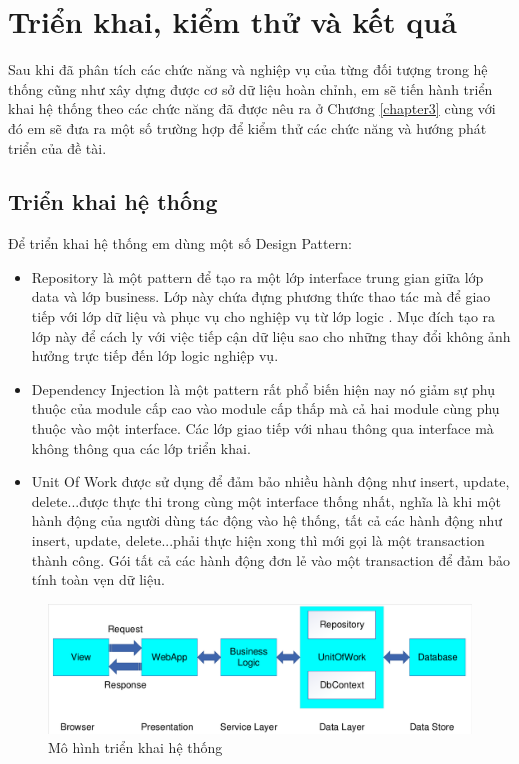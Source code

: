 \chapter{Triển khai, kiểm thử và kết quả}
\label{chapter4}
Sau khi đã phân tích các chức năng và nghiệp vụ của từng đối tượng trong hệ thống cũng như xây dựng được cơ sở dữ liệu hoàn chỉnh, em sẽ tiến hành triển khai hệ thống theo các chức năng đã được nêu ra ở Chương \ref{chapter3} cùng với đó em sẽ đưa ra một số trường hợp để kiểm thử các chức năng và hướng phát triển của đề tài.
\section{Triển khai hệ thống}
Để triển khai hệ thống em dùng một số Design Pattern:
\begin{itemize}
\item Repository là một pattern để tạo ra một lớp interface trung gian giữa lớp data và lớp business. Lớp này chứa đựng phương thức thao tác mà để giao tiếp với lớp dữ liệu và phục vụ cho nghiệp vụ từ lớp logic . Mục đích tạo ra lớp này để cách ly với việc tiếp cận dữ liệu sao cho những thay đổi không ảnh hưởng trực tiếp đến lớp logic nghiệp vụ.
\item Dependency Injection là một pattern rất phổ biến hiện nay nó giảm sự phụ thuộc của module cấp cao vào module cấp thấp mà cả hai module cùng phụ thuộc vào một interface. Các lớp giao tiếp với nhau thông qua interface mà không thông qua các lớp triển khai.
\item Unit Of Work được sử dụng để đảm bảo nhiều hành động như insert, update, delete...được thực thi trong cùng một interface thống nhất, nghĩa là khi một hành động của người dùng tác động vào hệ thống, tất cả các hành động như insert, update, delete...phải thực hiện xong thì mới gọi là một transaction thành công. Gói tất cả các hành động đơn lẻ vào một transaction để đảm bảo tính toàn vẹn dữ liệu.	
\end{itemize}
\begin{center}
    \begin{figure}[h]
    \begin{center}
     \includegraphics[scale=0.6]{image/MohinhDuongDiDuLieu.pdf}
    \end{center}
    \caption{Mô hình triển khai hệ thống}
    \label{refhinh4_1}
    \end{figure}
\end{center}

